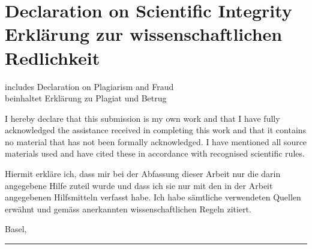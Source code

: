 \chapter[Declaration on Scientific Integrity]{Declaration on Scientific Integrity\\Erklärung zur wissenschaftlichen Redlichkeit}
\label{DeclarationOfAuthorship}

includes Declaration on Plagiarism and Fraud \\
beinhaltet Erklärung zu Plagiat und Betrug \vspace{1cm}

\authorsint

\immatriculnrint

\titleint

\thesistypeint

I hereby declare that this submission is my own work and that I have fully acknowledged the assistance received in completing this work and that it contains no material that has not been formally acknowledged. 
I have mentioned all source materials used and have cited these in accordance with recognised scientific rules.

\vspace{0.3cm}

Hiermit erkläre ich, dass mir bei der Abfassung dieser Arbeit nur die darin angegebene 
Hilfe zuteil wurde und dass ich sie nur mit den in der Arbeit angegebenen Hilfsmitteln 
verfasst habe. Ich habe sämtliche verwendeten Quellen erwähnt und gemäss anerkannten wissenschaftlichen Regeln zitiert. 


\vspace*{0.2cm} %

Basel, \dateint
\vspace*{0.25cm}

\begin{flushright}
\rule{75mm}{0.4pt} \\
\end{flushright}
